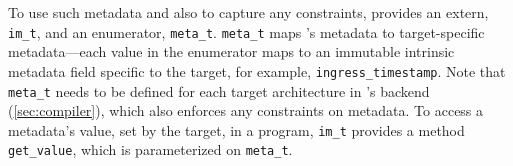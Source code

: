 \documentclass[letterpaper,twocolumn,10pt]{article}
\begin{document}
To use such metadata and also to capture any constraints, \uarch
provides an extern, \texttt{im\_t}, and an enumerator,
\texttt{meta\_t}. \texttt{meta\_t} maps \uarch's metadata to
target-specific metadata---each value in the enumerator maps to an
immutable intrinsic metadata field specific to the target, for
example, \texttt{ingress\_timestamp}. Note that \texttt{meta\_t} needs
to be defined for each target architecture in \ucomp's backend
(\cref{sec:compiler}), which also enforces any constraints on
metadata. To access a metadata's value, set by the target, in a
program, \texttt{im\_t} provides a method \texttt{get\_value}, which
is parameterized on \texttt{meta\_t}.
% 
% 
% 
\end{document}
